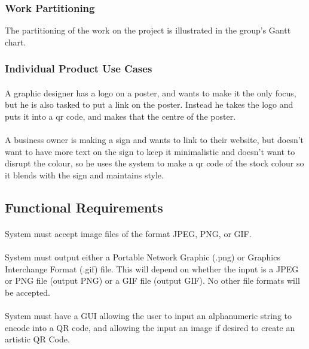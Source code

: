 \documentclass[12pt, titlepage]{article}
\begin{document}
\subsubsection{Work Partitioning}

	The partitioning of the work on the project is illustrated in the group's 
	Gantt chart.

\subsubsection{Individual Product Use Cases}

	\paragraph{}
	A graphic designer has a logo on a poster, and wants to make it the only 
	focus, but he is also tasked to put a link on the poster. Instead he takes 
	the logo and puts it into a qr code, and makes that the centre of the 
	poster.
	\paragraph{}
	 A business owner is making a sign and wants to link to their website, but 
	 doesn't want to have more text on the sign to keep it minimalistic and 
	 doesn't want to disrupt the colour, so he uses the system to make a qr 
	 code of the stock colour so it blends with the sign and maintains style.
	

\subsection{Functional Requirements}

	\paragraph{}
	System must accept image files of the format JPEG, PNG, or GIF.
	\paragraph{}
	System must output either a Portable Network Graphic (.png) or Graphics 
	Interchange Format (.gif) file. This will depend on whether the input is a 
	JPEG or PNG file (output PNG) or a GIF file (output GIF). No other file 
	formats will be accepted. 
	\paragraph{}
	System must have a GUI allowing the user to input an alphanumeric string to 
	encode into a QR code, and allowing the input an image if desired to create 
	an artistic QR Code.
\end{document}
